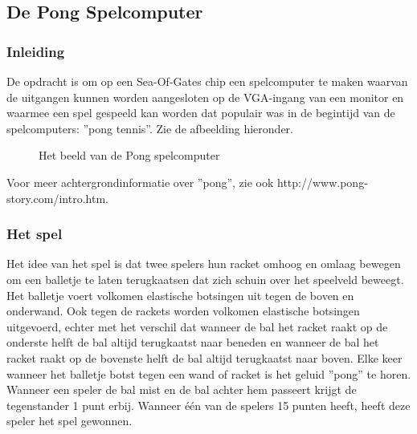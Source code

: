 \subsection{De Pong Spelcomputer}

\subsubsection{Inleiding}
De opdracht is om op een Sea-Of-Gates chip een spelcomputer te maken waarvan de uitgangen
kunnen worden aangesloten op de VGA-ingang van een monitor en waarmee een spel gespeeld
kan worden dat populair was in de begintijd van de spelcomputers: ''pong tennis''.
Zie de afbeelding hier\-onder.
\begin{figure}[h]
\centerline{}
\caption{Het beeld van de Pong spelcomputer}
\label{pongbeeld}
\end{figure}
Voor meer achtergrondinformatie over ''pong'', zie ook http://www.pong-story.com/intro.htm.

\subsubsection{Het spel}
Het idee van het spel is dat twee spelers hun racket omhoog en omlaag bewegen om een balletje
te laten terugkaatsen dat zich schuin over het speelveld beweegt.  Het balletje voert volkomen
elastische botsing\-en uit tegen de boven en onderwand.  Ook tegen de rackets worden volkomen
elastische botsing\-en uitgevoerd, echter met het verschil dat wanneer de bal het racket raakt op de
onderste helft de bal altijd terugkaatst naar beneden en wanneer de bal het racket raakt op de
bovenste helft de bal altijd terugkaatst naar boven. Elke keer wanneer het balletje botst tegen een
wand of racket is het geluid ''pong'' te horen. Wanneer een speler de bal mist en de bal achter hem
passeert krijgt de tegenstander 1 punt erbij.
Wanneer \'e\'en van de spelers 15 punten heeft, heeft deze speler het spel gewonnen.

